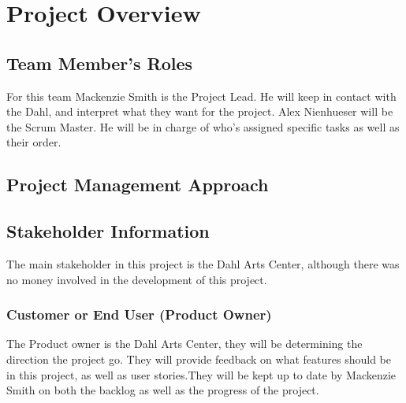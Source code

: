 

\chapter{Project Overview}



\section{Team Member's Roles}
For this team Mackenzie Smith is the Project Lead. He will keep in contact with the Dahl, and interpret what they want for the project. Alex Nienhueser will be the Scrum Master. He will be in charge of who's assigned specific tasks as well as their order.

\section{Project  Management Approach}


\section{Stakeholder Information}
The main stakeholder in this project is the Dahl Arts Center, although there was no money involved in the development of this project.


\subsection{Customer or End User (Product Owner)}
The Product owner is the Dahl Arts Center, they will be determining the direction the project go. They will provide feedback on what features should be in this project, as well as user stories.They will be kept up to date by Mackenzie Smith on both the backlog as well as the progress of the project.

